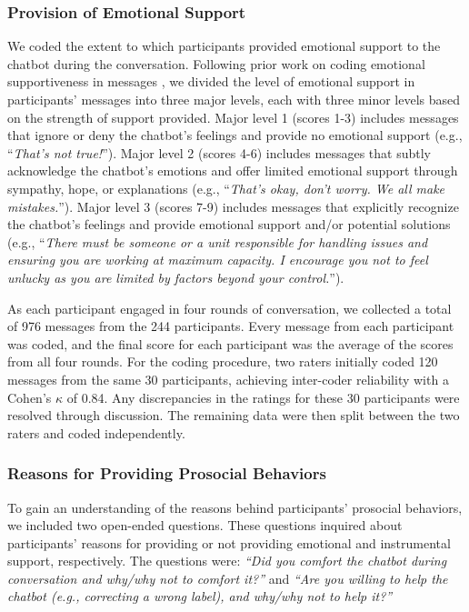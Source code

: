 \subsubsection{Provision of Emotional Support}
We coded the extent to which participants provided emotional support to the chatbot during the conversation. Following prior work on coding emotional supportiveness in messages \cite{Li2015what, burleson1982development}, we divided the level of emotional support in participants’ messages into three major levels, each with three minor levels based on the strength of support provided. Major level 1 (scores 1-3) includes messages that ignore or deny the chatbot’s feelings and provide no emotional support (e.g., “\textit{That’s not true!}”). Major level 2 (scores 4-6) includes messages that subtly acknowledge the chatbot’s emotions and offer limited emotional support through sympathy, hope, or explanations (e.g., “\textit{That’s okay, don’t worry. We all make mistakes.}”). Major level 3 (scores 7-9) includes messages that explicitly recognize the chatbot’s feelings and provide emotional support and/or potential solutions (e.g., “\textit{There must be someone or a unit responsible for handling issues and ensuring you are working at maximum capacity. I encourage you not to feel unlucky as you are limited by factors beyond your control.}”).

As each participant engaged in four rounds of conversation, we collected a total of 976 messages from the 244 participants. Every message from each participant was coded, and the final score for each participant was the average of the scores from all four rounds. For the coding procedure, two raters initially coded 120 messages from the same 30 participants, achieving inter-coder reliability with a Cohen’s $\kappa$ of 0.84. Any discrepancies in the ratings for these 30 participants were resolved through discussion. The remaining data were then split between the two raters and coded independently.


\subsubsection{Reasons for Providing Prosocial Behaviors}
To gain an understanding of the reasons behind participants' prosocial behaviors, we included two open-ended questions. 
These questions inquired about participants' reasons for providing or not providing emotional and instrumental support, respectively. The questions were: {\it ``Did you comfort the chatbot during conversation and why/why not to comfort it?''} and {\it ``Are you willing to help the chatbot (e.g., correcting a wrong label), and why/why not to help it?''}



